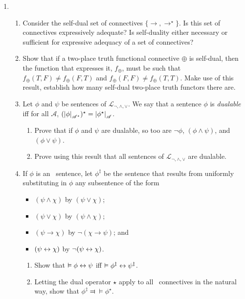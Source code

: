 {\begin{enumerate}
\item \begin{enumerate}
	\item Consider the self-dual set of connectives $\{\to,\to^{\star}\}$. Is this set of connectives expressively adequate? Is self-duality either necessary or sufficient for expressive adequacy of a set of connectives?  
\item Show that if a two-place truth functional connective $\oplus$ is self-dual,
	then the function that expresses it, $f_{\oplus}$, must be such that
	$f_{\oplus}(T, F) \neq  f_{\oplus}(F,T)$ and
	$f_{\oplus}(F,F) \neq f_{\oplus}(T,T)$. Make use of this
	result, establish how many self-dual two-place truth functors there
	are.
	\item Let $\phi$ and $\psi$ be sentences of $\mathcal{L}_{\neg,\wedge,\vee}$. We say that a sentence $\phi$ is \emph{dualable} iff for all $\mathscr{A}$, $(\left|\phi\right|_{\mathscr{A^{\star}}})^{\star}=\left|\phi^{\star}\right|_{\mathscr{A}}$. \begin{enumerate}
		\item Prove that if $\phi$ and $\psi$ are dualable, so too are $\neg\phi$, $(\phi\wedge\psi)$, and $(\phi\vee\psi)$.
		\item Prove using this result that all sentences of $\mathcal{L}_{\neg,\wedge,\vee}$ are dualable.
	\end{enumerate}
	\item If $\phi$ is an \lone\ sentence, let $\phi^{\ddag}$ be the sentence that results from uniformly substituting in $\phi$ any subsentence of the form 
	\begin{itemize} \item $(\psi \wedge \chi)$ by $(\psi \vee \chi)$;
	\item $(\psi \vee \chi)$ by $(\psi \wedge \chi)$;
	\item $(\psi \to \chi)$ by $\neg(\chi\to\psi)$; and
	\item $(\psi\leftrightarrow\chi)$ by $\neg(\psi\leftrightarrow\chi)$.
\end{itemize} \begin{enumerate}
	\item Show that $\vDash \phi \leftrightarrow \psi$ iff $\vDash \phi^{\ddag} \leftrightarrow \psi^{\ddag}$.
	\item Letting the dual operator $\star$ apply to all \lone\ connectives in the natural way, show that $\phi^{\ddag} \Dashv\vDash \phi^{\star}$. 
\end{enumerate}
\end{enumerate}


\end{enumerate}}
